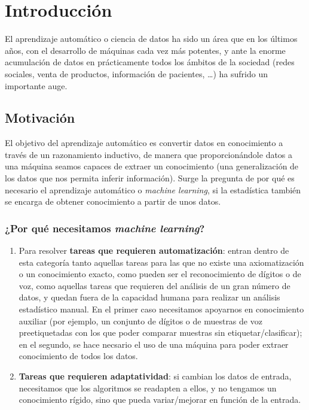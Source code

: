 \chapter{Introducción}
 El aprendizaje automático o ciencia de datos ha sido un área que en los últimos años, con el desarrollo de máquinas cada vez
 más potentes, y ante la enorme acumulación de datos en prácticamente todos los ámbitos de la sociedad (redes sociales, venta de
 productos, información de pacientes, \ldots) ha sufrido un importante auge.

 \section{Motivación}
 El objetivo del aprendizaje automático es convertir datos en conocimiento a través de un razonamiento inductivo, de manera que
 proporcionándole datos a una máquina seamos capaces de extraer un conocimiento (una generalización de los datos que nos permita
 inferir información). Surge la pregunta de por qué es necesario el aprendizaje automático o \textit{machine learning}, si la
 estadística también se encarga de obtener conocimiento a partir de unos datos.

 \subsection{¿Por qué necesitamos \textit{machine learning}?}
 \begin{enumerate}[i]
  \item Para resolver \textbf{tareas que requieren automatización}: entran dentro de esta categoría tanto aquellas tareas para
  las que no existe una axiomatización o un conocimiento exacto, como pueden ser el reconocimiento de dígitos o de voz, como 
  aquellas tareas que requieren del análisis de un gran número de datos, y quedan fuera de la capacidad humana para realizar
  un análisis estadístico manual. En el primer caso necesitamos apoyarnos en conocimiento auxiliar (por ejemplo, 
  un conjunto de dígitos o de muestras de voz preetiquetadas con los que poder comparar muestras sin etiquetar/clasificar); 
  en el segundo, se hace necsario el uso de una máquina para poder extraer conocimiento de todos los datos.
  
  \item \textbf{Tareas que requieren adaptatividad}: si cambian los datos de entrada, necesitamos que los algoritmos se readapten
  a ellos, y no tengamos un conocimiento rígido, sino que pueda variar/mejorar en función de la entrada.
 \end{enumerate}

